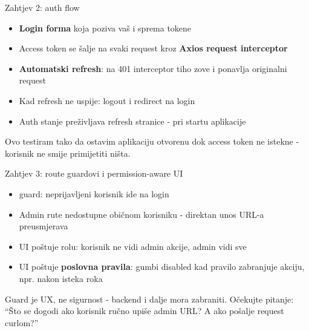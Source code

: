 \begin{frame}{Zahtjev 2: auth flow}
\begin{itemize}
  \item \textbf{Login forma} koja poziva vaš  i sprema tokene
  \item Access token se šalje na svaki request kroz \textbf{Axios request interceptor}
  \item \textbf{Automatski refresh}: na 401 interceptor tiho zove  i ponavlja originalni request
  \item Kad refresh ne uspije: logout i redirect na login
  \item Auth stanje preživljava refresh stranice -  pri startu aplikacije
\end{itemize}

\vspace{0.4em}
Ovo testiram tako da ostavim aplikaciju otvorenu dok access token ne istekne - korisnik ne smije primijetiti ništa.
\end{frame}

\begin{frame}{Zahtjev 3: route guardovi i permission-aware UI}
\begin{itemize}
  \item {} guard: neprijavljeni korisnik ide na login
  \item Admin rute nedostupne običnom korisniku - direktan unos URL-a preusmjerava
  \item UI poštuje rolu: korisnik ne vidi admin akcije, admin vidi sve
  \item UI poštuje \textbf{poslovna pravila}: gumbi disabled kad pravilo zabranjuje akciju, npr. nakon isteka roka
\end{itemize}

\vspace{0.6em}
Guard je UX, ne sigurnost - backend i dalje mora zabraniti. Očekujte pitanje: \enquote{Što se dogodi ako korisnik ručno upiše admin URL? A ako pošalje request curlom?}
\end{frame}

